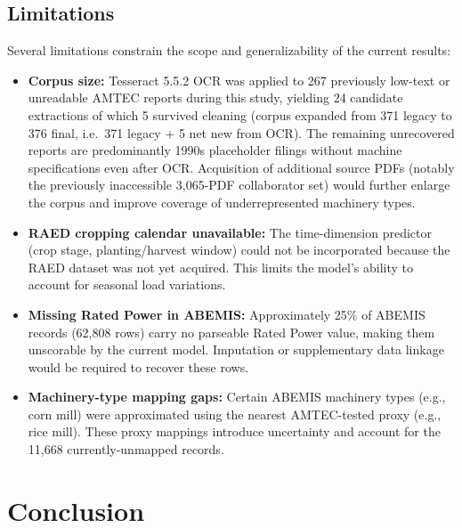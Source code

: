 \documentclass[conference]{IEEEtran}
\begin{document}
\subsection{Limitations}

Several limitations constrain the scope and generalizability of the current results:

\begin{itemize}
  \item \textbf{Corpus size:} Tesseract 5.5.2 OCR was applied to 267 previously low-text or unreadable AMTEC reports during this study, yielding 24 candidate extractions of which 5 survived cleaning (corpus expanded from 371 legacy to 376 final, i.e.\ 371 legacy + 5 net new from OCR). The remaining unrecovered reports are predominantly 1990s placeholder filings without machine specifications even after OCR. Acquisition of additional source PDFs (notably the previously inaccessible 3{,}065-PDF collaborator set) would further enlarge the corpus and improve coverage of underrepresented machinery types.

  \item \textbf{RAED cropping calendar unavailable:} The time-dimension predictor (crop stage, planting/harvest window) could not be incorporated because the RAED dataset was not yet acquired. This limits the model's ability to account for seasonal load variations.

  \item \textbf{Missing Rated Power in ABEMIS:} Approximately 25\% of ABEMIS records (62,808 rows) carry no parseable Rated Power value, making them unscorable by the current model. Imputation or supplementary data linkage would be required to recover these rows.

  \item \textbf{Machinery-type mapping gaps:} Certain ABEMIS machinery types (e.g., corn mill) were approximated using the nearest AMTEC-tested proxy (e.g., rice mill). These proxy mappings introduce uncertainty and account for the 11,668 currently-unmapped records.
\end{itemize}

\section{Conclusion}
\end{document}
